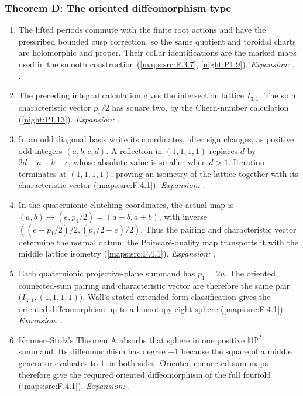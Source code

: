 \hypertarget{outline-V-D}{}
\subsubsection*{Theorem D: The oriented diffeomorphism type}
\begin{enumerate}[label=\arabic*.,leftmargin=*]
\item\hypertarget{step-V-D-1}{} The lifted periods commute with the finite root actions and
  have the prescribed bounded cusp correction, so the same quotient
  and toroidal charts are holomorphic and proper.  Their collar
  identifications are the marked maps used in the smooth construction
  (\cref{maps:src:F.3.7}, \cref{night:P1.9}).
\textit{Expansion:} , .
\item\hypertarget{step-V-D-2}{} The preceding integral calculation gives the intersection
  lattice $I_{3,1}$.  The spin characteristic vector $p_1/2$ has
  square two, by the Chern-number calculation
  (\cref{night:P1.13}).
\textit{Expansion:} .
\item\hypertarget{step-V-D-3}{} In an odd diagonal basis write its coordinates, after sign
  changes, as positive odd integers $(a,b,c,d)$.  A reflection in
  $(1,1,1,1)$ replaces $d$ by $2d-a-b-c$, whose absolute value is
  smaller when $d>1$.  Iteration terminates at $(1,1,1,1)$, proving
  an isometry of the lattice together with its characteristic vector
  (\cref{maps:src:F.4.1}).
\textit{Expansion:} .
\item\hypertarget{step-V-D-4}{} In the quaternionic clutching coordinates, the actual map is
  $(a,b)\mapsto(e,p_1/2)=(a-b,a+b)$, with inverse
  $((e+p_1/2)/2,(p_1/2-e)/2)$.  Thus the pairing and characteristic
  vector determine the normal datum; the Poincar\'e-duality map
  transports it with the middle lattice isometry
  (\cref{maps:src:F.4.1}).
\textit{Expansion:} .
\item\hypertarget{step-V-D-5}{} Each quaternionic projective-plane summand has $p_1=2u$.
  The oriented connected-sum pairing and characteristic vector are
  therefore the same pair $\bigl(I_{3,1},(1,1,1,1)\bigr)$.
  Wall's stated extended-form classification gives the oriented
  diffeomorphism up to a homotopy eight-sphere
  (\cref{maps:src:F.4.1}).
\textit{Expansion:} .
\item\hypertarget{step-V-D-6}{} Kramer--Stolz's Theorem A absorbs that sphere in one positive
  $\mathbb{HP}^2$ summand.  Its diffeomorphism has degree $+1$ because
  the square of a middle generator evaluates to $1$ on both sides.
  Oriented connected-sum maps therefore give the required oriented
  diffeomorphism of the full fourfold
  (\cref{maps:src:F.4.1}).
\textit{Expansion:} .
\end{enumerate}

